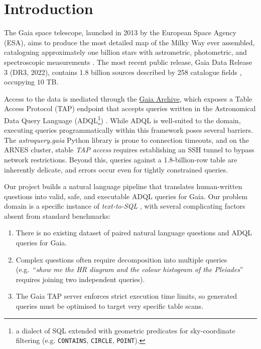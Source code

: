 \documentclass[fleqn,moreauthors,10pt]{ds_report}
\affiliation{\textit{Advisor: Aleš Žagar}}
\begin{document}
\flushbottom
\maketitle
\thispagestyle{empty}


\section{Introduction}

The Gaia space telescope, launched in 2013 by the European Space Agency (ESA), aims to produce the most detailed map of the Milky Way ever assembled, cataloguing approximately one billion stars with astrometric, photometric, and spectroscopic measurements \cite{GaiaMission2016}. The most recent public release, Gaia Data Release 3 (DR3, 2022), contains 1.8 billion sources described by 258 catalogue fields \cite{GaiaDR32023}, occupying $10$ TB. 

Access to the data is mediated through the \href{https://archives.esac.esa.int/gaia}{Gaia Archive}, which exposes a Table Access Protocol (TAP) endpoint that accepts queries written in the Astronomical Data Query Language (ADQL\footnote{a dialect of SQL extended with geometric predicates for sky-coordinate filtering (e.g. \texttt{CONTAINS}, \texttt{CIRCLE}, \texttt{POINT}). }) \cite{GAVIP2016}. While ADQL is well-suited to the domain, executing queries programmatically within this framework poses several barriers. The \textit{astroquery.gaia} Python library is prone to connection timeouts, and on the ARNES cluster, stable \textit{TAP access} requires establishing an SSH tunnel to bypass network restrictions. Beyond this, queries against a 1.8-billion-row table are inherently delicate, and errors occur even for tightly constrained queries.

Our project builds a natural language pipeline that translates human-written 
questions into valid, safe, and executable ADQL queries for Gaia. Our problem 
domain is a specific instance of \emph{text-to-SQL} \cite{dinsql2023}, with 
several complicating factors absent from standard benchmarks:
\begin{enumerate}
  \vspace{-0.1cm}
  \item There is no existing dataset of paired natural language questions and 
  ADQL queries for Gaia.
  \vspace{-0.2cm}
  \item Complex questions often require decomposition into multiple queries 
  (e.g.\ ``\textit{show me the HR diagram and the colour histogram of the 
  Pleiades}'' requires joining two independent queries).
  \vspace{-0.2cm}
  \item The Gaia TAP server enforces strict execution time limits, so generated 
  queries must be optimised to target very specific table scans.
  \vspace{-0.1cm}
\end{enumerate}
\end{document}

